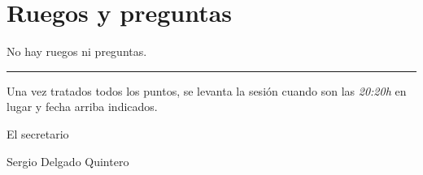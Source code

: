 \documentclass[a4paper, 12pt]{article}
\begin{document}
\section{Ruegos y preguntas}

No hay ruegos ni preguntas.


\vspace{1cm}
\hrule
\vspace{3mm}

Una vez tratados todos los puntos, se levanta la sesión cuando son las \textit{20:20h} en lugar y fecha arriba indicados.

\begin{flushright}
El secretario

Sergio Delgado Quintero
\end{flushright}
\end{document}
